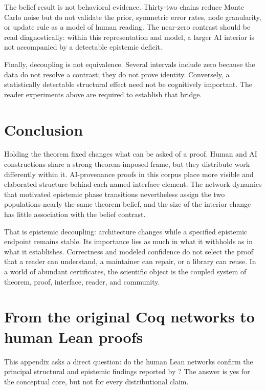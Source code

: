 \documentclass[11pt]{article}
\begin{document}
The belief result is not behavioral evidence.  Thirty-two chains reduce Monte Carlo noise but do
not validate the prior, symmetric error rates, node granularity, or update rule as a model of human
reading.  The near-zero contrast should be read diagnostically: within this representation and
model, a larger AI interior is not accompanied by a detectable epistemic deficit.

Finally, decoupling is not equivalence.  Several intervals include zero because the data do not
resolve a contrast; they do not prove identity.  Conversely, a statistically detectable structural
effect need not be cognitively important.  The reader experiments above are required to establish
that bridge.

\section{Conclusion}

Holding the theorem fixed changes what can be asked of a proof.  Human and AI constructions share a
strong theorem-imposed frame, but they distribute work differently within it.  AI-provenance proofs
in this corpus place more visible and elaborated structure behind each named interface element.  The network
dynamics that motivated epistemic phase transitions nevertheless assign the two populations nearly
the same theorem belief, and the size of the interior change has little association with the belief
contrast.

That is epistemic decoupling: architecture changes while a specified epistemic endpoint remains
stable.  Its importance lies as much in what it withholds as in what it establishes.  Correctness and
modeled confidence do not select the proof that a reader can understand, a maintainer can repair, or
a library can reuse.  In a world of abundant certificates, the scientific object is the coupled
system of theorem, proof, interface, reader, and community.

\appendix
\section{From the original Coq networks to human Lean proofs}
\label{app:coqlean}

This appendix asks a direct question: do the human Lean networks confirm the principal structural
and epistemic findings reported by \citet{viteri2022}?  The answer is yes for the conceptual core,
but not for every distributional claim.
\end{document}
